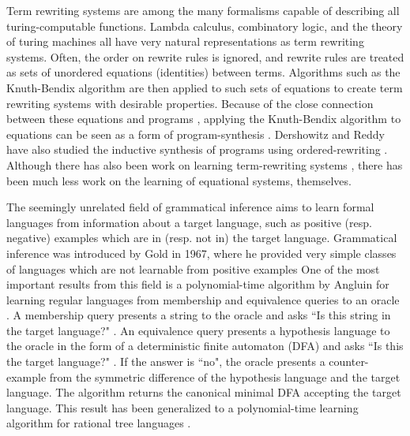 Term rewriting systems are among the many formalisms capable of describing all turing-computable functions.  %
Lambda calculus, combinatory logic, and the theory of turing machines all have very natural representations as term rewriting systems. %
Often, the order on rewrite rules is ignored, and rewrite rules are treated as sets of unordered equations (identities) between terms. 
Algorithms such as the Knuth-Bendix algorithm \citep{knuth1983simple} are then applied to such sets of equations to create term rewriting systems with desirable properties.
Because of the close connection between these equations and programs \citep{van1987logic, o1985equational}, applying the Knuth-Bendix algorithm to equations can be seen as a form of program-synthesis \citep{dershowitz1985synthesis}.
Dershowitz and Reddy have also studied the inductive synthesis of programs using ordered-rewriting \citep{dershowitz1993deductive}.
Although there has also been work on learning term-rewriting systems \citep{arimura2000learning, rao2006learnability}, there has been much less work on the learning of equational systems, themselves. 


The seemingly unrelated field of grammatical inference aims to learn formal languages from information about a target language, such as positive (resp. negative) examples which are in (resp. not in) the target language. %
Grammatical inference was introduced by Gold in 1967, where he provided very simple classes of languages which are not learnable from positive examples \citep{gold67}
One of the most important results from this field is a polynomial-time algorithm by Angluin for learning regular languages from membership and equivalence queries to an oracle \citep{angluin87}. 
A membership query presents a string to the oracle and asks ``Is this string in the target language?" . 
An equivalence query presents a hypothesis language to the oracle in the form of a deterministic finite automaton (DFA) and asks ``Is this the target language?" .
If the answer is ``no", the oracle presents a counter-example from the symmetric difference of the hypothesis language and the target language. 
The algorithm returns the canonical minimal DFA accepting the target language.
This result has been generalized to a polynomial-time learning algorithm for rational tree languages \citep{sakakibara90}.

